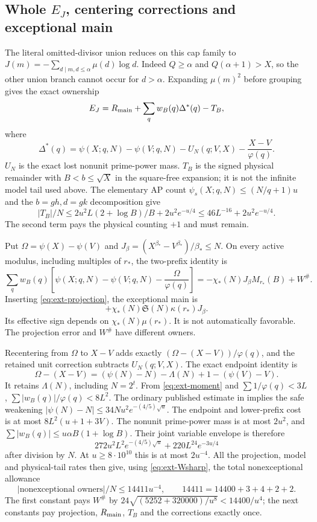 \documentclass[11pt,a4paper]{article}
\theoremstyle{definition}
\theoremstyle{remark}
\begin{document}
\subsection{Whole $E_J$, centering corrections and exceptional main}

The literal omitted-divisor union reduces on this cap family to
$J(m)=-\sum_{d\mid m,d\leq\alpha}\mu(d)\log d$.
Indeed $Q\geq\alpha$ and $Q(\alpha+1)>X$, so the other union
branch cannot occur for $d>\alpha$. Expanding $\mu(m)^2$ before
grouping gives the exact ownership
\[
 E_J=R_{\rm main}+\sum_qw_B(q)\Delta^*(q)-T_B,
\]
where
\[
 \Delta^*(q)=\psi(X;q,N)-\psi(V;q,N)-U_N(q;V,X)
                                -\frac{X-V}{\varphi(q)}.
\]
$U_N$ is the exact lost nonunit prime-power mass. $T_B$ is the
signed physical remainder with $B<b\leq\sqrt X$ in the square-free
expansion; it is not the infinite model tail used above.
The elementary AP count $\psi_s(X;q,N)\leq(N/q+1)u$ and the
$b=gh,d=gk$ decomposition give
\[
 |T_B|/N\leq2u^2L(2+\log B)/B+2u^2e^{-u/4}
                     \leq46L^{-16}+2u^2e^{-u/4}.
\]
The second term pays the physical counting $+1$ and must remain.

Put $\Omega=\psi(X)-\psi(V)$ and
$J_\beta=(X^{\beta_*}-V^{\beta_*})/\beta_*\leq N$.
On every active modulus, including multiples of $r_*$,
the two-prefix identity is
\[
 \sum_qw_B(q)\left[\psi(X;q,N)-\psi(V;q,N)
                            -\frac\Omega{\varphi(q)}\right]
   =-\chi_*(N)J_\beta M_{r_*}(B)+W^\#.
\]
Inserting \eqref{eq:ext-projection}, the exceptional main is
\[
       +\chi_*(N)\mathfrak S(N)\kappa(r_*)J_\beta.
\]
Its effective sign depends on $\chi_*(N)\mu(r_*)$. It is not
automatically favorable. The projection error and $W^\#$ have
different owners.

Recentering from $\Omega$ to $X-V$ adds exactly
$(\Omega-(X-V))/\varphi(q)$, and the retained unit correction
subtracts $U_N(q;V,X)$. The exact endpoint identity is
\[
 \Omega-(X-V)=(\psi(N)-N)-\Lambda(N)+1-(\psi(V)-V).
\]
It retains $\Lambda(N)$, including $N=2^t$. From
\eqref{eq:ext-moment} and $\sum1/\varphi(q)<3L$,
$\sum|w_B(q)|/\varphi(q)<8L^2$.
The ordinary published estimate in \cite{JY} implies the safe
weakening $|\psi(N)-N|\leq34Nu^2e^{-(4/5)\sqrt u}$.
The endpoint and lower-prefix cost is at most $8L^2(u+1+3V)$.
The nonunit prime-power mass is at most $2u^2$, and
$\sum|w_B(q)|\leq u\alpha B(1+\log B)$.
Their joint variable envelope is therefore
\[
 272u^2L^2e^{-(4/5)\sqrt u}+220L^{24}e^{-3u/4}
\]
after division by $N$. At $u\geq8\cdot10^{10}$ this is at most
$2u^{-4}$. All the projection, model and physical-tail rates then
give, using \eqref{eq:ext-Wsharp}, the total nonexceptional allowance
\[
 |\text{nonexceptional owners}|/N\leq14411u^{-4},
 \qquad14411=14400+3+4+2+2.
\]
The first constant pays $W^\#$ by
$24\sqrt{(5252+320000)/u^8}<14400/u^4$; the next constants pay
projection, $R_{\rm main}$, $T_B$ and the corrections exactly once.
\end{document}
